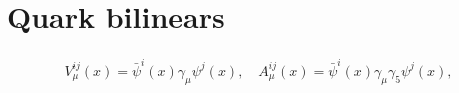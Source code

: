 
\chapter{Quark bilinears}
\label{apex_currents}

\begin{gather}
V_{\mu}^{ij}(x)=\bar{\psi}^i(x)\gamma_{\mu}\psi^j(x), \quad A_{\mu}^{ij}(x)=\bar{\psi}^i(x)\gamma_{\mu}\gamma_5\psi^j(x),
\end{gather}




